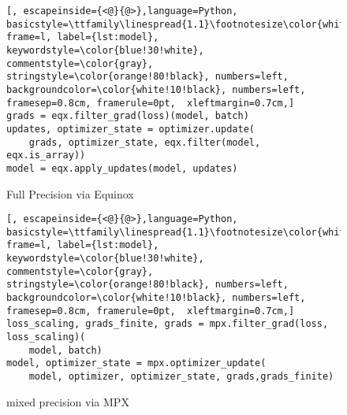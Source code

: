\documentclass[10pt, a4paper, logo, onecolumn, internal, copyright]{dsme}
\newcommand{\mpx}{\textsc{MPX}}
\begin{document}
\begin{example}[h]
    \centering
    \begin{subfigure}[t]{0.98\textwidth}
        \centering
        \begin{mdframed}[
            backgroundcolor=white!10!black,
            leftmargin=0.5cm,hidealllines=true,%
            innerleftmargin=0.2cm,innerrightmargin=0.2cm,innertopmargin=0cm,innerbottommargin=-0.10cm
        ]
            \begin{lstlisting}[, escapeinside={<@}{@>},language=Python, basicstyle=\ttfamily\linespread{1.1}\footnotesize\color{white!70!black}, frame=l, label={lst:model}, keywordstyle=\color{blue!30!white}, commentstyle=\color{gray}, stringstyle=\color{orange!80!black}, numbers=left, backgroundcolor=\color{white!10!black}, numbers=left, framesep=0.8cm, framerule=0pt,  xleftmargin=0.7cm,]
grads = eqx.filter_grad(loss)(model, batch)
updates, optimizer_state = optimizer.update(
    grads, optimizer_state, eqx.filter(model, eqx.is_array))
model = eqx.apply_updates(model, updates)
            \end{lstlisting}
        \end{mdframed}
        \vspace{-0.5cm}
        \caption{Full Precision via Equinox}
        \vspace{0.5cm}
    \end{subfigure}\hspace{0.1cm}
    \begin{subfigure}[t]{0.98\textwidth}
        \centering
        \begin{mdframed}[
            backgroundcolor=white!10!black,
            leftmargin=0.5cm,hidealllines=true,%
            innerleftmargin=0.2cm,innerrightmargin=0.2cm,innertopmargin=0cm,innerbottommargin=-0.10cm
        ]
            \begin{lstlisting}[, escapeinside={<@}{@>},language=Python, basicstyle=\ttfamily\linespread{1.1}\footnotesize\color{white!70!black}, frame=l, label={lst:model}, keywordstyle=\color{blue!30!white}, commentstyle=\color{gray}, stringstyle=\color{orange!80!black}, numbers=left, backgroundcolor=\color{white!10!black}, numbers=left, framesep=0.8cm, framerule=0pt,  xleftmargin=0.7cm,]
loss_scaling, grads_finite, grads = mpx.filter_grad(loss, loss_scaling)(
    model, batch)
model, optimizer_state = mpx.optimizer_update(
    model, optimizer, optimizer_state, grads,grads_finite)
            \end{lstlisting}
        \end{mdframed}
        \vspace{-0.5cm}
        \caption{mixed precision via MPX}
    \end{subfigure}
    \caption{Implementation of model updates via Equinox and \mpx{}. \mpx{} is designed such that its model update routine closely resembles the one of Equinox.}
    \label{ex:update}
\end{example}
\end{document}
